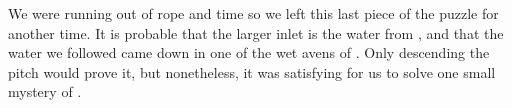 


    We were running out of rope and time so we left this last piece of the puzzle for another time. It is probable that the larger inlet is the water from , and that the water we followed came down in one of the wet avens of . Only descending the pitch would prove it, but nonetheless, it was satisfying for us to solve one small mystery of . 
